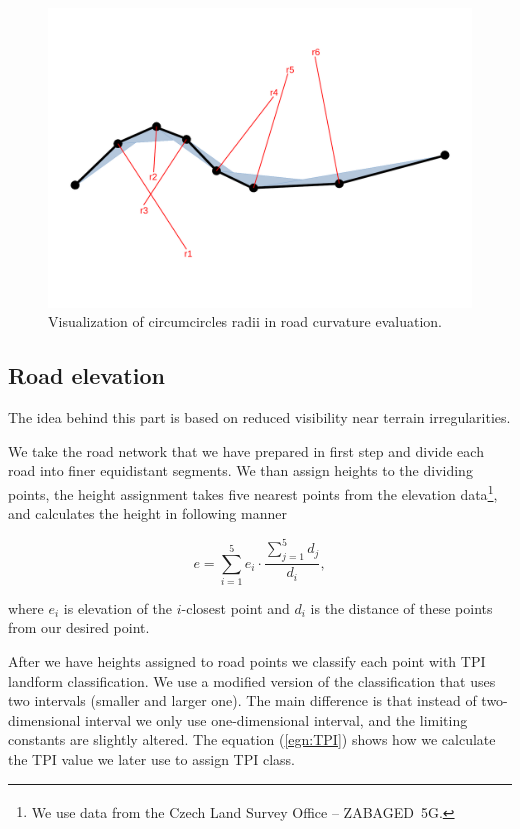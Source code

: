 \documentclass[oneside]{article}
\begin{document}
        \begin{figure}[H]
            \centering
            \includegraphics[trim={0cm 3.5cm 0cm 2.7cm}, clip, width=\linewidth]{path_curvature.pdf}
            \caption{Visualization of circumcircles radii in road curvature evaluation.}
            \label{fig:curvature}
        \end{figure}

        \subsection{Road elevation}
        The idea behind this part is based on reduced visibility near terrain irregularities. 

        We take the road network that we have prepared in first step and divide each road into finer equidistant segments. We than assign heights to the dividing points, the height assignment takes five nearest points from the elevation data\footnote{We use data from the Czech Land Survey Office -- ZABAGED\textsuperscript{\textregistered}\ 5G.}, and calculates the height in following manner

        \begin{equation}
            e=\sum_{i=1}^{5}e_{i}\cdot\frac{\sum_{j=1}^{5}d_{j}}{d_{i}},
        \end{equation}

        \noindent where $e_{i}$ is elevation of the $i$-closest point and $d_{i}$ is the distance of these points from our desired point.

        After we have heights assigned to road points we classify each point with TPI landform classification. We use a modified version of the classification that uses two intervals (smaller and larger one). The main difference is that instead of two-dimensional interval we only use one-dimensional interval, and the limiting constants are slightly altered. The equation (\ref{egn:TPI}) shows how we calculate the TPI value we later use to assign TPI class.
\end{document}
